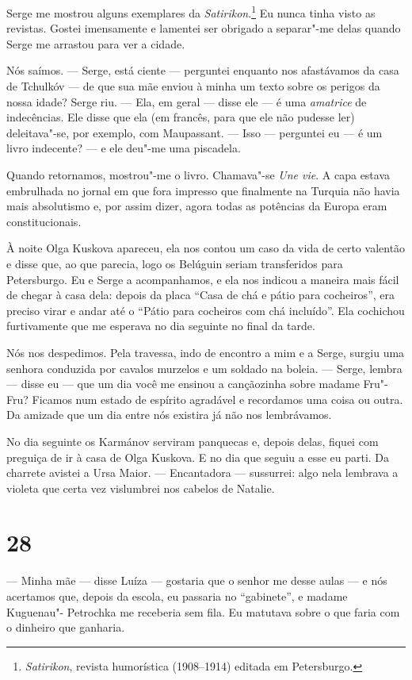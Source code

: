 Serge me mostrou alguns exemplares da \emph{Satirikon}.\footnote{\emph{Satirikon},
  revista humorística (1908--1914) editada em Petersburgo.} Eu nunca
tinha visto as revistas. Gostei imensamente e lamentei ser obrigado a
separar"-me delas quando Serge me arrastou para ver a cidade.

Nós saímos. --- Serge, está ciente --- perguntei enquanto nos
afastávamos da casa de Tchulkóv --- de que sua mãe enviou à minha um
texto sobre os perigos da nossa idade? Serge riu. --- Ela, em geral ---
disse ele --- é uma \emph{amatrice} de indecências. Ele disse que ela
(em francês, para que ele não pudesse ler) deleitava"-se, por exemplo,
com Maupassant. --- Isso --- perguntei eu --- é um livro indecente? ---
e ele deu"-me uma piscadela.

Quando retornamos, mostrou"-me o livro. Chamava"-se \emph{Une vie}. A capa
estava embrulhada no jornal em que fora impresso que finalmente na
Turquia não havia mais absolutismo e, por assim dizer, agora todas as
potências da Europa eram constitucionais.

À noite Olga Kuskova apareceu, ela nos contou um caso da vida de certo
valentão e disse que, ao que parecia, logo os Belúguin seriam
transferidos para Petersburgo. Eu e Serge a acompanhamos, e ela nos
indicou a maneira mais fácil de chegar à casa dela: depois da placa
``Casa de chá e pátio para cocheiros'', era preciso virar e andar até o
``Pátio para cocheiros com chá incluído''. Ela cochichou furtivamente
que me esperava no dia seguinte no final da tarde.

Nós nos despedimos. Pela travessa, indo de encontro a mim e a Serge,
surgiu uma senhora conduzida por cavalos murzelos e um soldado na
boleia. --- Serge, lembra --- disse eu --- que um dia você me ensinou a
cançãozinha sobre madame Fru"-Fru? Ficamos num estado de espírito
agradável e recordamos uma coisa ou outra. Da amizade que um dia entre
nós existira já não nos lembrávamos.

No dia seguinte os Karmánov serviram panquecas e, depois delas, fiquei
com preguiça de ir à casa de Olga Kuskova. E no dia que seguiu a esse eu
parti. Da charrete avistei a Ursa Maior. --- Encantadora --- sussurrei:
algo nela lembrava a violeta que certa vez vislumbrei nos cabelos de
Natalie.

\section{28}

--- Minha mãe --- disse Luíza --- gostaria que o senhor me desse aulas
--- e nós acertamos que, depois da escola, eu passaria no ``gabinete'',
e madame Kuguenau"- Petrochka me receberia sem fila. Eu matutava sobre o
que faria com o dinheiro que ganharia.

